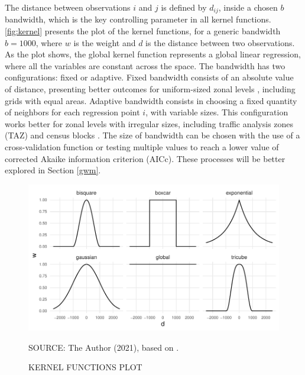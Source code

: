 The distance between observations $i$ and $j$ is defined by $d_{ij}$, inside a chosen $b$ bandwidth, which is the key controlling parameter in all kernel functions. \autoref{fig:kernel} presents the plot of the kernel functions, for a generic bandwidth $b = 1000$, where $w$ is the weight and $d$ is the distance between two observations. As the plot shows, the global kernel function represents a global linear regression, where all the variables are constant across the space. The bandwidth has two configurations: fixed or adaptive. Fixed bandwidth consists of an absolute value of distance, presenting better outcomes for uniform-sized zonal levels \cite{Huang2018}, including grids with equal areas. Adaptive bandwidth consists in choosing a fixed quantity of neighbors for each regression point $i$, with variable sizes. This configuration works better for zonal levels with irregular sizes, including traffic analysis zones (TAZ) and census blocks \cite{Yu2017}. The size of bandwidth can be chosen with the use of a cross-validation function or testing multiple values to reach a lower value of corrected Akaike information criterion (AICc). These processes will be better explored in Section \ref{gwm}.

\begin{figure}[!htbp]
    \centering\footnotesize
    \captionsetup{font=footnotesize}
    \caption{KERNEL FUNCTIONS PLOT}
    \includegraphics{fig/kernel.pdf}
    \label{fig:kernel}
    \par SOURCE: The Author (2021), based on \textcite{Gollini2013}.
\end{figure}

